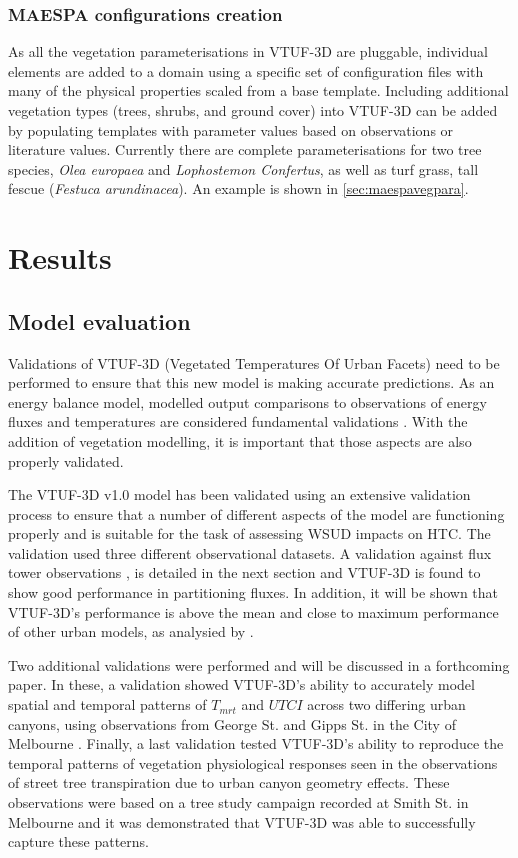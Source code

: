 \documentclass[final,3p,times,authoryear]{elsarticle}
\begin{document}
\subsubsection{MAESPA configurations creation}\label{section:MaespaTreeConfig}




As all the vegetation parameterisations in VTUF-3D are pluggable, individual elements are added to a domain using a specific set of configuration files with many of the physical properties scaled from a base template.  Including additional vegetation types (trees, shrubs, and ground cover) into VTUF-3D can be added by populating templates with parameter values based on observations or literature values. Currently there are complete parameterisations for two tree species, \textit{Olea europaea} and \textit{Lophostemon Confertus}, as well as turf grass, tall fescue (\textit{Festuca arundinacea}). An example is shown in \ref{sec:maespavegpara}.  


\section{Results}
\subsection{Model evaluation}
Validations of VTUF-3D (Vegetated Temperatures Of Urban Facets) need to be performed to ensure that this new model is making accurate predictions. As an energy balance model, modelled output comparisons to observations of energy fluxes and temperatures are considered fundamental validations \citep{Masson2002a}. With the addition of vegetation modelling, it is important that those aspects are also properly validated. 

The VTUF-3D v1.0 model has been validated using an extensive validation process to ensure that a number of different aspects of the model are functioning properly and is suitable for the task of assessing WSUD impacts on HTC. The validation used three different observational datasets. A validation against flux tower observations \citep{Coutts2007}, is detailed in the next section and VTUF-3D is found to show good performance in partitioning fluxes. In addition, it will be shown that VTUF-3D's performance is above the mean and close to maximum performance of other urban models, as analysied by \cite{Best2012}. 

Two additional validations were performed and will be discussed in a forthcoming paper. In these, a validation showed VTUF-3D's ability to accurately model spatial and temporal patterns of $T_{mrt}$ and $UTCI$ across two differing urban canyons, using observations from George St. and Gipps St. in the City of Melbourne \citep{Coutts2015,White2012}. Finally, a last validation tested VTUF-3D's ability to reproduce the temporal patterns of vegetation physiological responses seen in the observations of street tree transpiration due to urban canyon geometry effects. These observations were based on a  tree study campaign recorded at Smith St. in Melbourne \citep{Gebert2012,Coutts2014a} and it was demonstrated that VTUF-3D was able to successfully capture these patterns.
\end{document}
